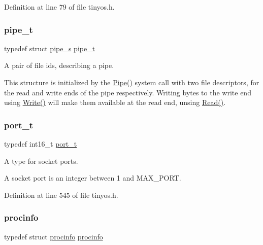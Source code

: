 Definition at line 79 of file tinyos.\+h.

\mbox{\label{group__syscalls_gad56b5ceaaf7d3ab88b4be7f622314dfb}} 
\subsubsection{\texorpdfstring{pipe\+\_\+t}{pipe\_t}}
{\footnotesize\ttfamily typedef struct \hyperlink{structpipe__s}{pipe\+\_\+s}  \hyperlink{group__syscalls_gad56b5ceaaf7d3ab88b4be7f622314dfb}{pipe\+\_\+t}}



A pair of file ids, describing a pipe. 

This structure is initialized by the {\ttfamily \hyperlink{group__syscalls_gab6355ce54e047c31538ed5ed9108b5b3}{Pipe()}} system call with two file descriptors, for the read and write ends of the pipe respectively. Writing bytes to the write end using {\ttfamily \hyperlink{group__syscalls_gaf046f003fde24f79fb395c250137856c}{Write()}} will make them available at the read end, unsing {\ttfamily \hyperlink{group__syscalls_ga3e9dc545a789eb45b2d356eabbac3ee3}{Read()}}. \mbox{\label{group__syscalls_ga13894e5a2ffd5febb7aeb90e87239d61}} 
\subsubsection{\texorpdfstring{port\+\_\+t}{port\_t}}
{\footnotesize\ttfamily typedef int16\+\_\+t \hyperlink{group__syscalls_ga13894e5a2ffd5febb7aeb90e87239d61}{port\+\_\+t}}



A type for socket ports. 

A socket port is an integer between 1 and {\ttfamily M\+A\+X\+\_\+\+P\+O\+RT}. 

Definition at line 545 of file tinyos.\+h.

\mbox{\label{group__syscalls_ga9682d9066f643f8d18cff58fd3fb09b9}} 
\subsubsection{\texorpdfstring{procinfo}{procinfo}}
{\footnotesize\ttfamily typedef struct \hyperlink{structprocinfo}{procinfo}  \hyperlink{structprocinfo}{procinfo}}



